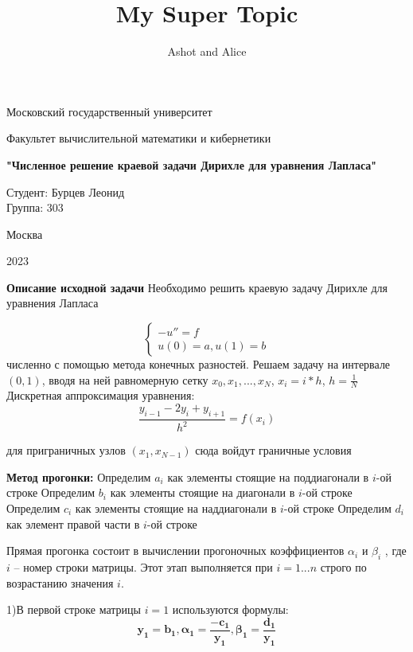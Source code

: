 \documentclass{beamer}
\title{My Super Topic}
\author{Ashot and Alice}
\begin{document}
\begin{frame}
\thispagestyle{empty}
\centerline{Московский государственный университет}
\vfill
\centerline{Факультет вычислительной математики и кибернетики}
\vfill
\vfill
\vfill
\vfill
\Large
\begin{centering}
{\bfseries "Численное решение краевой задачи Дирихле для уравнения Лапласа"}
\end{centering}
\normalsize
\vfill
\vfill
\vfill
\begin{flushright}
Студент: Бурцев Леонид\\
Группа: 303
\end{flushright}
\vfill
\vfill
\centerline{Москва}
\centerline{2023}
\pagebreak
\end{frame}

\begin{frame}
\textbf{Описание исходной задачи}
\newline
Необходимо решить краевую задачу Дирихле для уравнения Лапласа

\begin{equation*}
 \begin{cases}
   -u'' = f\\
   u(0) = a, u(1) = b 
 \end{cases}
\end{equation*}
численно с помощью метода конечных разностей.
\newline
Решаем задачу на интервале $(0, 1)$, вводя на ней равномерную сетку $x_0, x_1, ..., x_N$,
$x_i = i * h$,
$h = \frac{1}{N}$
Дискретная аппроксимация уравнения:
$$\frac{y_{i-1}-2y_i+y_{i+1}}{h^{2}} = f(x_i)$$

для приграничных узлов $(x_1, x_{N-1})$
сюда войдут граничные условия
\end{frame}

\begin{frame}
\textbf{Метод прогонки: }
\newline
Определим $a_i$ как элементы стоящие на поддиагонали в $i$-ой строке
\newline
Определим $b_i$ как элементы стоящие на диагонали в $i$-ой строке
\newline
Определим $c_i$ как элементы стоящие на наддиагонали в $i$-ой строке
\newline
Определим $d_i$ как элемент правой части в $i$-ой строке
\newline

Прямая прогонка состоит в вычислении прогоночных коэффициентов $\alpha_i$ и $\beta_i$ , где $i$ – номер строки матрицы. Этот этап выполняется при $i = 1...n$ строго по возрастанию значения $i$.

1)В первой строке матрицы $i = 1$ используются формулы:
\[\mathbf{y_1=b_1, \alpha_1=\frac{-c_1}{y_1}, \beta_1=\frac{d_1}{y_1}}\]
\end{frame}
\end{document}
